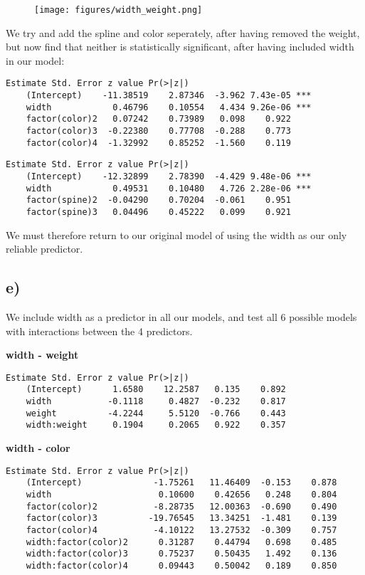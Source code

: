 \documentclass[a4paper, twocolumn]{article}
\begin{document}
\begin{figure}
    \texttt{[image: figures/width\_weight.png]}
    \caption{}
    \label{fig:width_weight}
\end{figure}

We try and add the spline and color seperately, after having removed the weight, but now find that neither is statistically significant, after having included width in our model:
\begin{Verbatim}[fontsize=\scriptsize]
                    Estimate Std. Error z value Pr(>|z|)    
    (Intercept)    -11.38519    2.87346  -3.962 7.43e-05 ***
    width            0.46796    0.10554   4.434 9.26e-06 ***
    factor(color)2   0.07242    0.73989   0.098    0.922    
    factor(color)3  -0.22380    0.77708  -0.288    0.773    
    factor(color)4  -1.32992    0.85252  -1.560    0.119    
\end{Verbatim}

\begin{Verbatim}[fontsize=\scriptsize]
                    Estimate Std. Error z value Pr(>|z|)    
    (Intercept)    -12.32899    2.78390  -4.429 9.48e-06 ***
    width            0.49531    0.10480   4.726 2.28e-06 ***
    factor(spine)2  -0.04290    0.70204  -0.061    0.951    
    factor(spine)3   0.04496    0.45222   0.099    0.921    
\end{Verbatim}

We must therefore return to our original model of using the width as our only reliable predictor.


\subsection*{e)}
We include width as a predictor in all our models, and test all 6 possible models with interactions between the 4 predictors.

\textbf{width - weight}
\begin{Verbatim}[fontsize=\scriptsize]
                    Estimate Std. Error z value Pr(>|z|)    
    (Intercept)      1.6580    12.2587   0.135    0.892
    width           -0.1118     0.4827  -0.232    0.817
    weight          -4.2244     5.5120  -0.766    0.443
    width:weight     0.1904     0.2065   0.922    0.357
\end{Verbatim}

\textbf{width - color}
\begin{Verbatim}[fontsize=\scriptsize]
                            Estimate Std. Error z value Pr(>|z|)    
    (Intercept)              -1.75261   11.46409  -0.153    0.878
    width                     0.10600    0.42656   0.248    0.804
    factor(color)2           -8.28735   12.00363  -0.690    0.490
    factor(color)3          -19.76545   13.34251  -1.481    0.139
    factor(color)4           -4.10122   13.27532  -0.309    0.757
    width:factor(color)2      0.31287    0.44794   0.698    0.485
    width:factor(color)3      0.75237    0.50435   1.492    0.136
    width:factor(color)4      0.09443    0.50042   0.189    0.850
\end{Verbatim}
\end{document}
